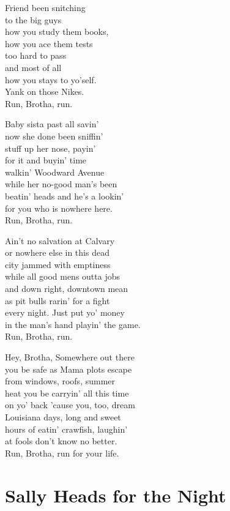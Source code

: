 \documentclass[twoside,10pt]{book}
\begin{document}
Friend been snitching\\
to the big guys\\
how you study them books,\\
how you ace them tests\\
too hard to pass\\
and most of all\\
how you stays to yo'self.\\
Yank on those Nikes.\\
Run, Brotha, run.

Baby sista past all savin'\\
now she done been sniffin'\\
stuff up her nose, payin'\\
for it and buyin' time\\
walkin' Woodward Avenue\\
while her no-good man's been\\
beatin' heads and he's a lookin'\\
for you who is nowhere here.\\
Run, Brotha, run.

Ain't no salvation at Calvary\\
or nowhere else in this dead\\
city jammed with emptiness\\
while all good mens outta jobs\\
and down right, downtown mean\\
as pit bulls rarin' for a fight\\
every night. Just put yo' money\\
in the man's hand playin' the game.\\
Run, Brotha, run.

Hey, Brotha, Somewhere out there\\
you be safe as Mama plots escape\\
from windows, roofs, summer\\
heat you be carryin' all this time\\
on yo' back 'cause you, too, dream\\
\clearpage
Louisiana days, long and sweet\\
hours of eatin' crawfish, laughin'\\
at fools don't know no better.\\
Run, Brotha, run for your life.


\clearpage
\section{Sally Heads for the Night}
\end{document}
